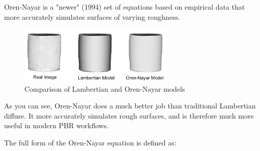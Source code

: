 \documentclass[12pt,letterpaper]{article}
\begin{document}
Oren-Nayar is a "newer" (1994) set of equations based on empirical data that more accurately simulates surfaces of varying roughness.

\begin{figure}[htbp]
    \centering
    \includegraphics[width=20em]{Oren-nayar-vase2}
    \caption{Comparison of Lambertian and Oren-Nayar models}
    \label{fig:lambert_orennayar_comparison}
\end{figure}

As you can see, Oren-Nayar does a much better job than traditional Lambertian diffuse. 
It more accurately simulates rough surfaces, and is therefore much more useful in modern PBR workflows.

The full form of the Oren-Nayar equation is defined as:
\end{document}
